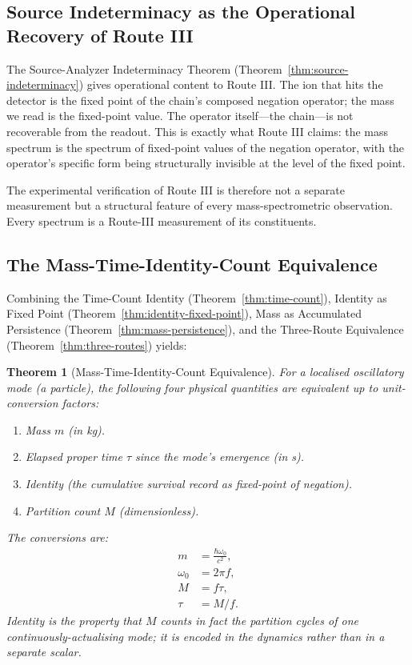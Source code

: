 \documentclass[twocolumn,10pt,a4paper]{article}
\newtheorem{theorem}{Theorem}[section]
\theoremstyle{definition}
\theoremstyle{remark}
\newcommand{\Mcount}{M}
\begin{document}
\subsection{Source Indeterminacy as the Operational Recovery of Route III}

The Source-Analyzer Indeterminacy Theorem (Theorem~\ref{thm:source-indeterminacy}) gives operational content to Route III. The ion that hits the detector is the fixed point of the chain's composed negation operator; the mass we read is the fixed-point value. The operator itself---the chain---is not recoverable from the readout. This is exactly what Route III claims: the mass spectrum is the spectrum of fixed-point values of the negation operator, with the operator's specific form being structurally invisible at the level of the fixed point.

The experimental verification of Route III is therefore not a separate measurement but a structural feature of every mass-spectrometric observation. Every spectrum is a Route-III measurement of its constituents.

\subsection{The Mass-Time-Identity-Count Equivalence}

Combining the Time-Count Identity (Theorem~\ref{thm:time-count}), Identity as Fixed Point (Theorem~\ref{thm:identity-fixed-point}), Mass as Accumulated Persistence (Theorem~\ref{thm:mass-persistence}), and the Three-Route Equivalence (Theorem~\ref{thm:three-routes}) yields:

\begin{theorem}[Mass-Time-Identity-Count Equivalence]
\label{thm:equivalence}
For a localised oscillatory mode (a particle), the following four physical quantities are equivalent up to unit-conversion factors:
\begin{enumerate}[leftmargin=1.5em,itemsep=0.2em]
    \item Mass $m$ (in kg).
    \item Elapsed proper time $\tau$ since the mode's emergence (in s).
    \item Identity (the cumulative survival record as fixed-point of negation).
    \item Partition count $\Mcount$ (dimensionless).
\end{enumerate}
The conversions are:
\begin{align}
    m &= \frac{\hbar \omega_0}{c^2}, \\
    \omega_0 &= 2\pi f, \\
    \Mcount &= f \tau, \\
    \tau &= \Mcount / f.
\end{align}
Identity is the property that $\Mcount$ counts in fact the partition cycles of one continuously-actualising mode; it is encoded in the dynamics rather than in a separate scalar.
\end{theorem}
\end{document}
